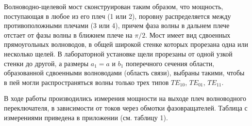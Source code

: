 Волноводно-щелевой мост сконструирован таким образом, что мощность, поступающая в любое из его плеч (1 или 2), поровну распределяется между противоположными плечами (3 или 4), причем фаза волны в дальнем плече отстает от фазы волны в ближнем плече на $\pi/2$. Мост имеет вид сдвоенных прямоугольных волноводов, в общей широкой стенке которых прорезана одна
 или несколько щелей. В лабораторной установке щели прорезаны от одной узкой стенки до другой, а размеры $a_1=a$ и $b_1$ поперечного сечения области, образованной сдвоенными волноводами (область связи), выбраны такими, чтобы в пей могли распространяться волны только трех типов $TE_{10}$, $TE_{01}$, $TE_{11}$.

В ходе работы производились измерения мощности на выходе плеч волноводного переключателя, в зависимости от
токов через обмотки фазовращателей. Таблица с измерениями приведена в приложении (см. таблицу 1).

